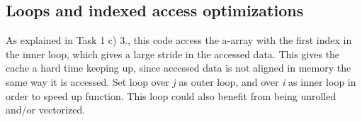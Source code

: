 \documentclass[english,a4paper,numbers=noenddot]{scrartcl}
\begin{document}
\subsection{Loops and indexed access optimizations}
As explained in Task 1 c) 3., this code access the a-array with the first index in the inner loop, which gives a large stride in the accessed data. This gives the cache a hard time keeping up, since accessed data is not
aligned in memory the same way it is accessed. Set loop over \emph{j} as outer loop, and over \emph{i} as inner loop in order to speed up function. This loop could also benefit from being unrolled and/or vectorized.
\end{document}
